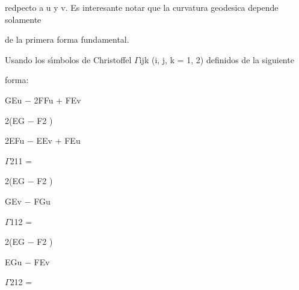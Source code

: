 \documentclass[a4paper,portrait,12pt]{article}
\begin{document}
\begin{flushleft}
redpecto a u y v. Es interesante notar que la curvatura geodesica depende solamente
\end{flushleft}


\begin{flushleft}
de la primera forma fundamental.
\end{flushleft}


\begin{flushleft}
Usando los s\i{}́mbolos de Christoffel $\Gamma$ijk (i, j, k = 1, 2) definidos de la siguiente
\end{flushleft}


\begin{flushleft}
forma:
\end{flushleft}





\begin{flushleft}
GEu $-$ 2FFu + FEv
\end{flushleft}


\begin{flushleft}
2(EG $-$ F2 )
\end{flushleft}


\begin{flushleft}
2EFu $-$ EEv + FEu
\end{flushleft}


\begin{flushleft}
$\Gamma$211 =
\end{flushleft}


\begin{flushleft}
2(EG $-$ F2 )
\end{flushleft}


\begin{flushleft}
GEv $-$ FGu
\end{flushleft}


\begin{flushleft}
$\Gamma$112 =
\end{flushleft}


\begin{flushleft}
2(EG $-$ F2 )
\end{flushleft}


\begin{flushleft}
EGu $-$ FEv
\end{flushleft}


\begin{flushleft}
$\Gamma$212 =
\end{flushleft}
\end{document}
